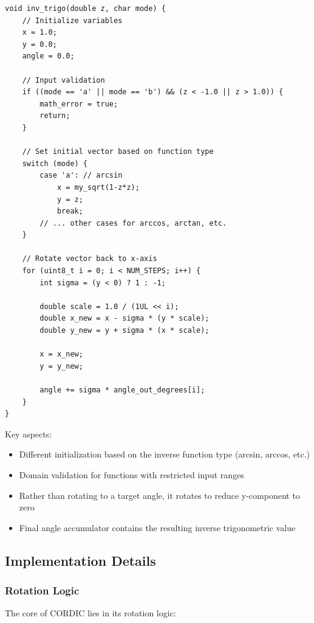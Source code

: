 \documentclass[12pt]{article}
\begin{document}
\begin{verbatim}
void inv_trigo(double z, char mode) {
    // Initialize variables
    x = 1.0;
    y = 0.0;
    angle = 0.0;
    
    // Input validation
    if ((mode == 'a' || mode == 'b') && (z < -1.0 || z > 1.0)) {
        math_error = true;
        return;
    }
    
    // Set initial vector based on function type
    switch (mode) {  
        case 'a': // arcsin
            x = my_sqrt(1-z*z);  
            y = z;
            break;
        // ... other cases for arccos, arctan, etc.
    }
    
    // Rotate vector back to x-axis
    for (uint8_t i = 0; i < NUM_STEPS; i++) {
        int sigma = (y < 0) ? 1 : -1;
        
        double scale = 1.0 / (1UL << i);
        double x_new = x - sigma * (y * scale);
        double y_new = y + sigma * (x * scale);
        
        x = x_new;
        y = y_new;
        
        angle += sigma * angle_out_degrees[i];
    }
}
\end{verbatim}

Key aspects:
\begin{itemize}
    \item Different initialization based on the inverse function type (arcsin, arccos, etc.)
    \item Domain validation for functions with restricted input ranges
    \item Rather than rotating to a target angle, it rotates to reduce y-component to zero
    \item Final angle accumulator contains the resulting inverse trigonometric value
\end{itemize}

\subsection{Implementation Details}

\subsubsection{Rotation Logic}

The core of CORDIC lies in its rotation logic:
\end{document}
